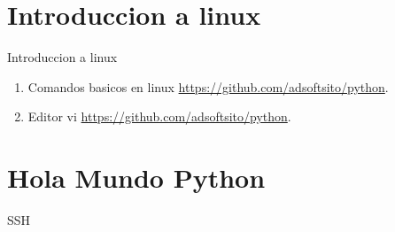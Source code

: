 \documentclass{beamer}
\begin{document}
\section{Introduccion a linux}

\begin{frame}


Introduccion a linux

\begin{enumerate}
\item
	Comandos basicos en linux \href{https://github.com/adsoftsito/python}{https://github.com/adsoftsito/python}.
\item
	Editor vi \href{https://github.com/adsoftsito/python}{https://github.com/adsoftsito/python}.

\end{enumerate} 


\end{frame}


\section{Hola Mundo Python}

\begin{frame}


\begin{block}{SSH}


\end{block}


\end{frame}
\end{document}
